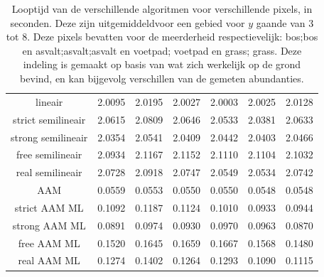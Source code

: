 \documentclass[12pt]{report}
\begin{document}
\begin{table}
\centering
\begin{tabular}{|c|c|c|c|c|c|c|}
\hline
 &  &  &  &  &  &  \\
\hline
lineair  & 2.0095 & 2.0195 & 2.0027 & 2.0003 & 2.0025 & 2.0128 \\
\hline
strict semilineair  & 2.0615 & 2.0809 & 2.0646 & 2.0533 & 2.0381 & 2.0633 \\
\hline
strong semilineair  & 2.0354 & 2.0541 & 2.0409 & 2.0442 & 2.0403 & 2.0466 \\
\hline
free semilineair  & 2.0934 & 2.1167 & 2.1152 & 2.1110 & 2.1104 & 2.1032 \\
\hline
real semilineair  & 2.0728 & 2.0918 & 2.0747 & 2.0549 & 2.0534 & 2.0742 \\
\hline
AAM  & 0.0559 & 0.0553 & 0.0550 & 0.0550 & 0.0548 & 0.0548 \\
\hline
strict AAM ML  & 0.1092 & 0.1187 & 0.1124 & 0.1010 & 0.0933 & 0.0944 \\
\hline
strong AAM ML  & 0.0891 & 0.0974 & 0.0930 & 0.0970 & 0.0963 & 0.0870 \\
\hline
free AAM ML  & 0.1520 & 0.1645 & 0.1659 & 0.1667 & 0.1568 & 0.1480 \\
\hline
real AAM ML  & 0.1274 & 0.1402 & 0.1264 & 0.1293 & 0.1090 & 0.1115 \\
\hline
\end{tabular}
\caption{Looptijd van de verschillende algoritmen voor verschillende pixels, in seconden. Deze zijn uitgemiddeldvoor een gebied voor $y$ gaande van 3 tot 8. Deze pixels bevatten voor de meerderheid respectievelijk: bos;bos en asvalt;asvalt;asvalt en voetpad; voetpad en grass; grass. Deze indeling is gemaakt op basis van wat zich werkelijk op de grond bevind, en kan bijgevolg verschillen van de gemeten abundanties.
\label{table:Mruntime}}
\end{table}
\end{document}
